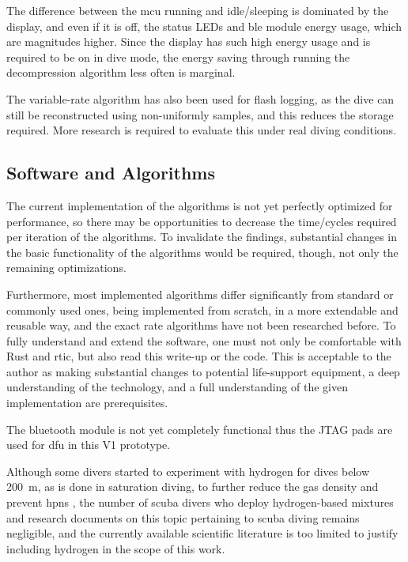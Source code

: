 The difference between the \gls{mcu} running and idle/sleeping is dominated by the display, and even if it is off, the status LEDs and \gls{ble} module energy usage, which are magnitudes higher.
Since the display has such high energy usage and is required to be on in dive mode, the energy saving through running the decompression algorithm less often is marginal.

The variable-rate algorithm has also been used for flash logging, as the dive can still be reconstructed using non-uniformly samples, and this reduces the storage required.
More research is required to evaluate this under real diving conditions.

\subsection{Software and Algorithms}
The current implementation of the algorithms is not yet perfectly optimized for performance, so there may be opportunities to decrease the time/cycles required per iteration of the algorithms. 
To invalidate the findings, substantial changes in the basic functionality of the algorithms would be required, though, not only the remaining optimizations.

Furthermore, most implemented algorithms differ significantly from standard or commonly used ones, being implemented from scratch, in a more extendable and reusable way, and the exact rate algorithms have not been researched before. 
To fully understand and extend the software, one must not only be comfortable with Rust and \gls{rtic}, but also read this write-up or the code.
This is acceptable to the author as making substantial changes to potential life-support equipment, a deep understanding of the technology, and a full understanding of the given implementation are prerequisites.

The bluetooth module is not yet completely functional thus the JTAG pads are used for \gls{dfu} in this V1 prototype.

Although some divers started to experiment with hydrogen for dives below \SI{200}{\m}, as is done in saturation diving, to further reduce the gas density and prevent \gls{hpns} \cite{hydrogen-dive-2024}, the number of scuba divers who deploy hydrogen-based mixtures and research documents on this topic pertaining to scuba diving remains negligible, and the currently available scientific literature is too limited to justify including hydrogen in the scope of this work.
